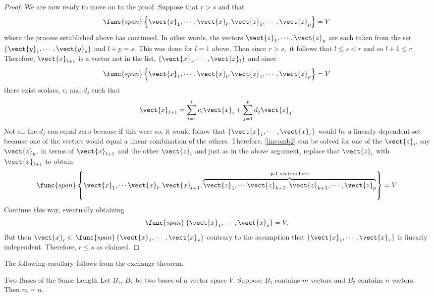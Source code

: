 \begin{proof}
We are now ready to move on to the proof. Suppose that $r>s$ and that 
\[
\func{span}\left\{ \vect{x}_{1},\cdots ,
\vect{x}_{l},\vect{z}_{1},\cdots ,\vect{z}_{p}\right\} =V
\]
 where the process established above has continued. In other words, the vectors $\vect{z}_{1},\cdots ,\vect{z}_{p}$ are each taken from the
set $\left\{ \vect{y}_{1},\cdots ,\vect{y}_{s}\right\} $ and $l+p=s.$
This was done for $l=1$ above. Then since $r>s,$ it follows that $
l\leq s<r$ and so $l+1\leq r.$ Therefore, $\vect{x}_{l+1}$ is a vector not
in the list, $\left\{ \vect{x}_{1},\cdots ,\vect{x}_{l}\right\} $ and
since 
\[
\func{span}\left\{ \vect{x}_{1},\cdots ,\vect{x}_{l},\vect{z}
_{1},\cdots ,\vect{z}_{p}\right\} =V
\]
 there exist scalars, $c_{i}$ and $
d_{j}$ such that 
\begin{equation}
\vect{x}_{l+1}=\sum_{i=1}^{l}c_{i}\vect{x}_{i}+\sum_{j=1}^{p}d_{j}
\vect{z}_{j}.  \label{lincomb2}
\end{equation}
Not all the $d_{j}$ can equal zero because if this were so, it would follow
that $\left\{ \vect{x}_{1},\cdots ,\vect{x}_{r}\right\} $ would be a
linearly dependent set because one of the vectors would equal a linear
combination of the others. Therefore, \ref{lincomb2} can be solved for one of the 
$\vect{z}_{i},$ say $\vect{z}_{k},$ in terms of $\vect{x}_{l+1}$ and
the other $\vect{z}_{i}$ and just as in the above argument, replace that $
\vect{z}_{i}$ with $\vect{x}_{l+1}$ to obtain 
\begin{equation*}
\func{span}\left\{ \vect{x}_{1},\cdots \vect{x}_{l},\vect{x}_{l+1},
\overset{\text{p-1 vectors here}}{\overbrace{\vect{z}_{1},\cdots \vect{z}
_{k-1},\vect{z}_{k+1},\cdots ,\vect{z}_{p}}}\right\} =V
\end{equation*}
Continue this way, eventually obtaining 
\begin{equation*}
\func{span}\left\{ \vect{x}_{1},\cdots ,\vect{x}_{s}\right\} =V.
\end{equation*}
But then $\vect{x}_{r}\in $ $\func{span}\left\{ \vect{x}_{1},\cdots ,
\vect{x}_{s}\right\} $ contrary to the assumption that $\left\{ \vect{x}
_{1},\cdots ,\vect{x}_{r}\right\} $ is linearly independent. Therefore, $
r\leq s$ as claimed.
\end{proof}

The following corollary follows from the exchange theorem.

\begin{corollary}{Two Bases of the Same Length}\label{cor:baseslength}
Let $B_1$, $B_2$ be two bases of a vector space $V$. Suppose $B_1$ contains $m$ vectors and $B_2$ contains $n$ vectors. Then $m = n$. 
\end{corollary}

